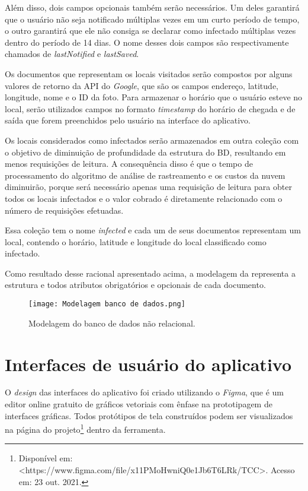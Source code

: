 Além disso, dois campos opcionais também serão necessários. Um deles garantirá que o usuário não seja notificado múltiplas vezes em um curto período de tempo, o outro garantirá que ele não consiga se declarar como infectado múltiplas vezes dentro do período de 14 dias. O nome desses dois campos são respectivamente chamados de \textit{lastNotified} e \textit{lastSaved}.

Os documentos que representam os locais visitados serão compostos por alguns valores de retorno da API do \textit{Google}, que são os campos endereço, latitude, longitude, nome e o ID da foto. Para armazenar o horário que o usuário esteve no local, serão utilizados campos no formato \textit{timestamp} do horário de chegada e de saída que forem preenchidos pelo usuário na interface do aplicativo.

Os locais considerados como infectados serão armazenados em outra coleção com o objetivo de diminuição de profundidade da estrutura do BD, resultando em menos requisições de leitura. A consequência disso é que o tempo de processamento do algoritmo de análise de rastreamento e os custos da nuvem diminuirão, porque será necessário apenas uma requisição de leitura para obter todos os locais infectados e o valor cobrado é diretamente relacionado com o número de requisições efetuadas.

Essa coleção tem o nome \textit{infected} e cada um de seus documentos representam um local, contendo o horário, latitude e longitude do local classificado como infectado.

Como resultado desse racional apresentado acima, a modelagem da  representa a estrutura e todos atributos obrigatórios e opcionais de cada documento.

\begin{figure}[!htb]
  \centering
  \texttt{[image: Modelagem banco de dados.png]}
  \caption{Modelagem do banco de dados não relacional.}
  \label{fig:modelagemfirestore}
\end{figure}

\section{Interfaces de usuário do aplicativo}\label{sec:uiux}
O \textit{design} das interfaces do aplicativo foi criado utilizando o \textit{Figma}, que é um editor online gratuito de gráficos vetoriais com ênfase na prototipagem de interfaces gráficas. Todos protótipos de tela construídos podem ser visualizados na página do projeto\footnote{Disponível em: <https://www.figma.com/file/x11PMoHwniQ0e1Jb6T6LRk/TCC>. Acesso em: 23 out. 2021.} dentro da ferramenta. 

